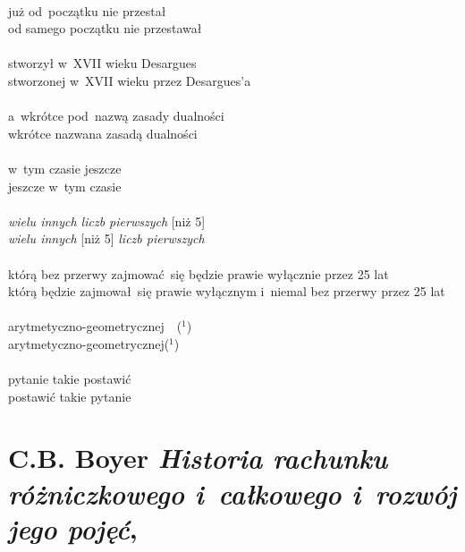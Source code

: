 \documentclass[a4paper,11pt]{article}
\numberwithin{equation}{section}
\begin{document}
\noindent
{} \\
\Jest już od~początku nie przestał  \\
\PowinnoByc od samego początku nie przestawał \\
 \\
\Jest stworzył w~XVII wieku Desargues \\
\PowinnoByc stworzonej w~XVII wieku przez Desargues'a \\
 \\
\Jest a~wkrótce pod~nazwą zasady dualności \\
\PowinnoByc wkrótce nazwana zasadą dualności \\
 \\
\Jest w~tym czasie jeszcze \\
\PowinnoByc jeszcze w~tym czasie \\
 \\
\Jest \textit{wielu innych liczb pierwszych} [niż 5] \\
\PowinnoByc \textit{wielu innych} [niż 5] \textit{liczb pierwszych} \\
 \\
\Jest którą bez przerwy zajmować~się będzie prawie wyłącznie przez 25 lat \\
\PowinnoByc którą będzie zajmował~się prawie wyłącznym i~niemal bez przerwy
przez 25 lat \\
 \\
\Jest arytmetyczno-geometrycznej~~($^{ 1 }$) \\
\PowinnoByc arytmetyczno-geometrycznej($^{ 1 }$) \\
 \\
\Jest pytanie takie postawić \\
\PowinnoByc postawić takie pytanie \\












\newpage

\section{C.B. Boyer \textit{Historia rachunku różniczkowego
    i~całkowego i~rozwój jego pojęć},
  \parencite{Boyer-Historia-rachunku-rozniczkowego-i-calkowego-Pub-1964}}
\end{document}
